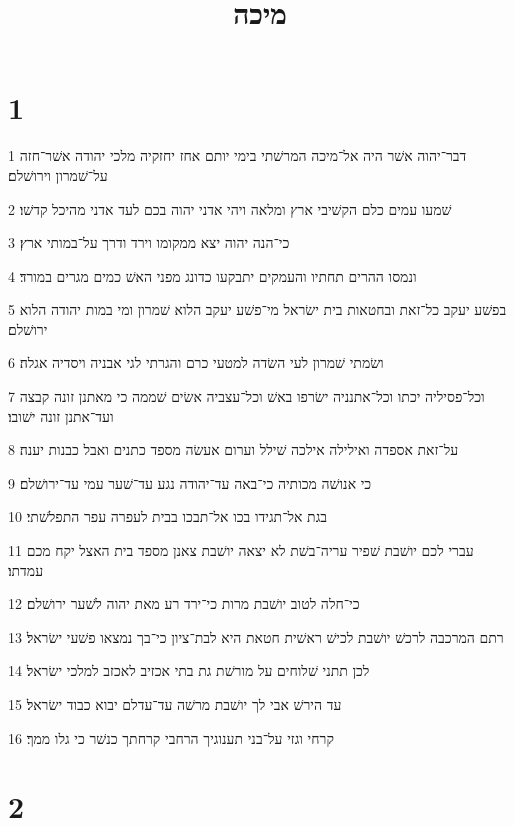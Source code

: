 

\title{מיכה}


\chapter{1}

\par 1 דבר־יהוה אשׁר היה אל־מיכה המרשׁתי בימי יותם אחז יחזקיה מלכי יהודה אשׁר־חזה על־שׁמרון וירושׁלם׃
\par 2 שׁמעו עמים כלם הקשׁיבי ארץ ומלאה ויהי אדני יהוה בכם לעד אדני מהיכל קדשׁו׃
\par 3 כי־הנה יהוה יצא ממקומו וירד ודרך על־במותי ארץ׃
\par 4 ונמסו ההרים תחתיו והעמקים יתבקעו כדונג מפני האשׁ כמים מגרים במורד׃
\par 5 בפשׁע יעקב כל־זאת ובחטאות בית ישׂראל מי־פשׁע יעקב הלוא שׁמרון ומי במות יהודה הלוא ירושׁלם׃
\par 6 ושׂמתי שׁמרון לעי השׂדה למטעי כרם והגרתי לגי אבניה ויסדיה אגלה׃
\par 7 וכל־פסיליה יכתו וכל־אתנניה ישׂרפו באשׁ וכל־עצביה אשׂים שׁממה כי מאתנן זונה קבצה ועד־אתנן זונה ישׁובו׃
\par 8 על־זאת אספדה ואילילה אילכה שׁילל וערום אעשׂה מספד כתנים ואבל כבנות יענה׃
\par 9 כי אנושׁה מכותיה כי־באה עד־יהודה נגע עד־שׁער עמי עד־ירושׁלם׃
\par 10 בגת אל־תגידו בכו אל־תבכו בבית לעפרה עפר התפלשׁתי׃
\par 11 עברי לכם יושׁבת שׁפיר עריה־בשׁת לא יצאה יושׁבת צאנן מספד בית האצל יקח מכם עמדתו׃
\par 12 כי־חלה לטוב יושׁבת מרות כי־ירד רע מאת יהוה לשׁער ירושׁלם׃
\par 13 רתם המרכבה לרכשׁ יושׁבת לכישׁ ראשׁית חטאת היא לבת־ציון כי־בך נמצאו פשׁעי ישׂראל׃
\par 14 לכן תתני שׁלוחים על מורשׁת גת בתי אכזיב לאכזב למלכי ישׂראל׃
\par 15 עד הירשׁ אבי לך יושׁבת מרשׁה עד־עדלם יבוא כבוד ישׂראל׃
\par 16 קרחי וגזי על־בני תענוגיך הרחבי קרחתך כנשׁר כי גלו ממך׃

\chapter{2}

